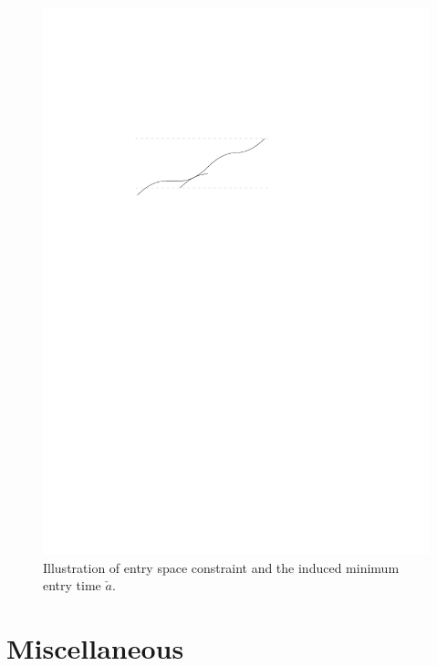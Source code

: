 \documentclass[a4paper]{article}
\theoremstyle{definition}
\theoremstyle{plain}
\begin{document}
\begin{figure}
  \centering
  \includegraphics[scale=1]{figures/motion/rough/bufferconstraint}
  \caption{Illustration of entry space constraint and the induced minimum entry
    time $\check{a}$.}%
  \label{fig:bufferconstraint}
\end{figure}



\newpage
\appendix
\section{Miscellaneous}
\end{document}
